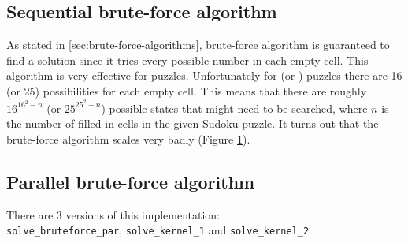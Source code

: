 \documentclass[12pt,a4paper]{article}
\newcommand{\code}[1]{\colorbox{light-gray}{\texttt{#1}}}
\begin{document}
	\subsection{Sequential brute-force algorithm}
		As stated in \ref{sec:brute-force-algorithms}, brute-force algorithm is guaranteed to find a solution since it tries every possible number in each empty cell.
		This algorithm is very effective for  puzzles. Unfortunately for  (or ) puzzles
		there are \num{16} (or \num{25}) possibilities for each empty cell. This means that there are roughly $16^{16^{2} - n}$ (or $25^{25^{2} - n}$)
		possible states that might need to be searched, where $n$ is the number of filled-in cells in the given Sudoku puzzle.
		It turns out that the brute-force algorithm scales very badly (Figure \ref{fig:sequential-brute-force}).
		\begin{figure}[H]
			\centering
			\caption{}
			\label{fig:sequential-brute-force}
		\end{figure}

	\subsection{Parallel brute-force algorithm}
		There are 3 versions of this implementation:\\
		\code{solve\_bruteforce\_par}, \code{solve\_kernel\_1} and \code{solve\_kernel\_2}
		
\end{document}
